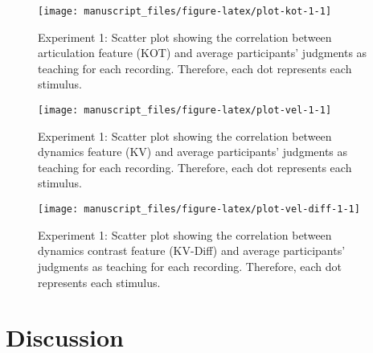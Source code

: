\documentclass[
  man,floatsintext]{apa6}
\begin{document}
\begin{figure}

{\centering \texttt{[image: manuscript\_files/figure-latex/plot-kot-1-1]} 

}

\caption{\label{fig:kot-1}Experiment 1: Scatter plot showing the correlation between articulation feature (KOT) and average participants' judgments as teaching for each recording. Therefore, each dot represents each stimulus.}\label{fig:plot-kot-1}
\end{figure}

\begin{figure}

{\centering \texttt{[image: manuscript\_files/figure-latex/plot-vel-1-1]} 

}

\caption{\label{fig:vel-1}Experiment 1: Scatter plot showing the correlation between dynamics feature (KV) and average participants' judgments as teaching for each recording. Therefore, each dot represents each stimulus.}\label{fig:plot-vel-1}
\end{figure}

\begin{figure}

{\centering \texttt{[image: manuscript\_files/figure-latex/plot-vel-diff-1-1]} 

}

\caption{\label{fig:vel-diff-1}Experiment 1: Scatter plot showing the correlation between dynamics contrast feature (KV-Diff) and average participants' judgments as teaching for each recording. Therefore, each dot represents each stimulus.}\label{fig:plot-vel-diff-1}
\end{figure}

\clearpage

\hypertarget{discussion}{%
\section{Discussion}\label{discussion}}
\end{document}
